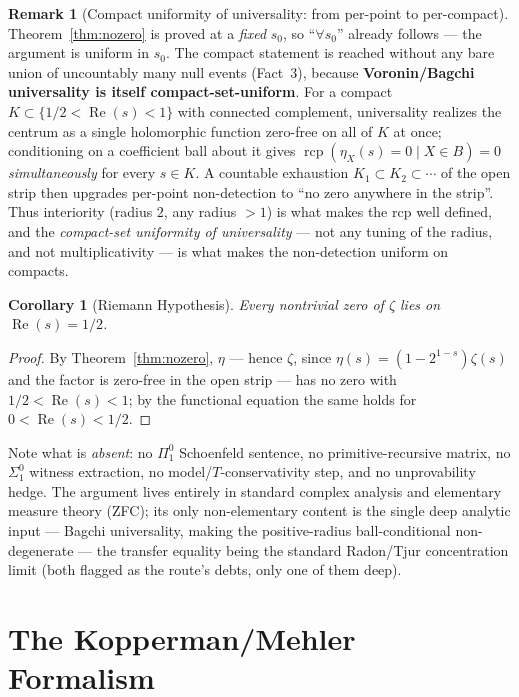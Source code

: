 \documentclass[11pt,a4paper]{article}
\newtheorem{corollary}[theorem]{Corollary}
\theoremstyle{definition}
\newtheorem{remark}[theorem]{Remark}
\newcommand{\Rea}{\operatorname{Re}}
\newcommand{\etaX}{\eta_X}
\newcommand{\rcp}{\operatorname{rcp}}
\begin{document}
\begin{remark}[Compact uniformity of universality: from per-point to per-compact]\label{rem:epsknob}
Theorem~\ref{thm:nozero} is proved at a \emph{fixed} \(s_0\), so ``\(\forall s_0\)'' already
follows --- the argument is uniform in \(s_0\). The compact statement is reached without any bare
union of uncountably many null events (Fact~3), because \textbf{Voronin/Bagchi universality is
itself compact-set-uniform}. For a compact \(K\subset\{1/2<\Rea(s)<1\}\) with connected complement,
universality realizes the centrum as a single holomorphic function zero-free on all of \(K\) at
once; conditioning on a coefficient ball about it gives \(\rcp(\etaX(s)=0\mid X\in B)=0\)
\emph{simultaneously} for every \(s\in K\). A countable exhaustion
\(K_1\subset K_2\subset\cdots\) of the open strip then upgrades per-point non-detection to ``no
zero anywhere in the strip''. Thus interiority (radius \(2\), any radius \(>1\)) is what makes the
rcp well defined, and the \emph{compact-set uniformity of universality} --- not any tuning of the
radius, and not multiplicativity --- is what makes the non-detection uniform on compacts.
\end{remark}

\begin{corollary}[Riemann Hypothesis]\label{cor:rh}
Every nontrivial zero of \(\zeta\) lies on \(\Rea(s)=1/2\).
\end{corollary}
\begin{proof}
By Theorem~\ref{thm:nozero}, \(\eta\) --- hence \(\zeta\), since \(\eta(s)=(1-2^{1-s})
\zeta(s)\) and the factor is zero-free in the open strip --- has no zero with
\(1/2<\Rea(s)<1\); by the functional equation the same holds for \(0<\Rea(s)<1/2\).
\end{proof}

Note what is \emph{absent}: no \(\Pi^0_1\) Schoenfeld sentence, no primitive-recursive
matrix, no \(\Sigma^0_1\) witness extraction, no model/\(T\)-conservativity step, and no
unprovability hedge. The argument lives entirely in standard complex analysis and
elementary measure theory (ZFC); its only non-elementary content is the single deep analytic
input --- Bagchi universality, making the positive-radius ball-conditional non-degenerate ---
the transfer equality being the standard Radon/Tjur concentration limit (both flagged as the
route's debts, only one of them deep).

\section{The Kopperman/Mehler Formalism}\label{sec:kopperman}
\end{document}
